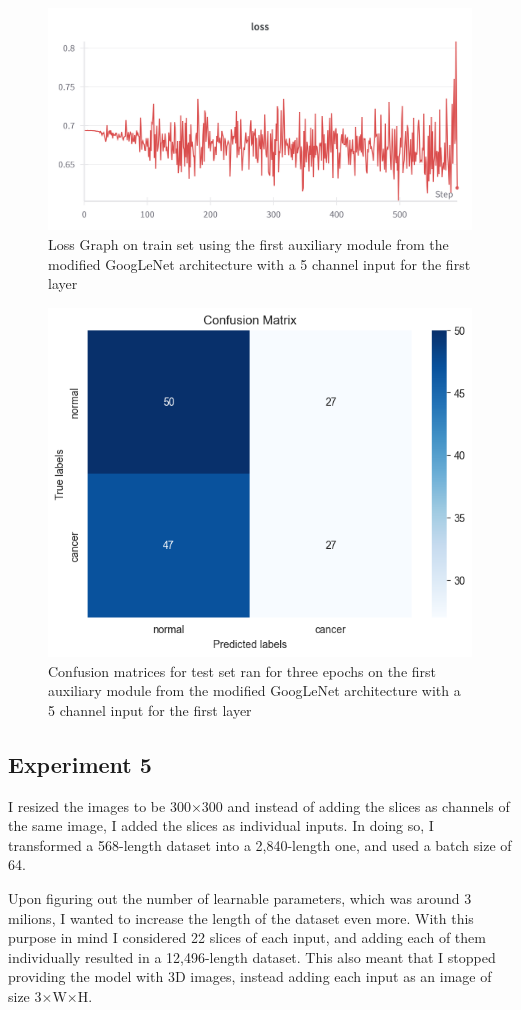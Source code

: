 \begin{figure}[!ht]
    \centering
    \includegraphics[width=0.75\linewidth]{figures/Figure17.png}
    \caption{Loss Graph on train set using the first auxiliary module from the modified GoogLeNet architecture with a 5 channel input for the first layer}
    \label{fig:fig16}
\end{figure}

\begin{figure}[H]
    \centering
    \includegraphics[width=0.5\linewidth]{figures/Figure18.png}
    \caption{Confusion matrices for test set ran for three epochs on the first auxiliary module from the modified GoogLeNet architecture with a 5 channel input for the first layer}
    \label{fig:fig17}
\end{figure}

\subsection{Experiment 5}

I resized the images to be 300$\times$300 and instead of adding the slices as channels of the same image, I added the slices as individual inputs. In doing so, I transformed a 568-length dataset into a 2,840-length one, and used a batch size of 64.

Upon figuring out the number of learnable parameters, which was around 3 milions, I wanted to increase the length of the dataset even more. With this purpose in mind I considered 22 slices of each input, and adding each of them individually resulted in a 12,496-length dataset. This also meant that I stopped providing the model with 3D images, instead adding each input as an image of size 3$\times$W$\times$H.

